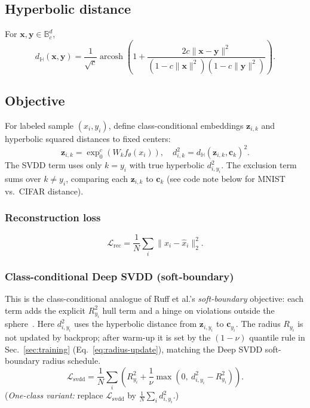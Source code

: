\documentclass[conference]{IEEEtran}
\DeclareMathOperator{\arcosh}{arcosh}
\begin{document}
\subsection{Hyperbolic distance}
For $\mathbf{x},\mathbf{y}\in\mathbb{B}_c^d$,
\begin{equation}
d_{\mathbb{H}}(\mathbf{x},\mathbf{y})=
\frac{1}{\sqrt{c}}
\arcosh\!\left(
1+\frac{2c\|\mathbf{x}-\mathbf{y}\|^2}
{(1-c\|\mathbf{x}\|^2)(1-c\|\mathbf{y}\|^2)}
\right).
\end{equation}

\subsection{Objective}
For labeled sample $(x_i,y_i)$, define class-conditional embeddings $\mathbf{z}_{i,k}$ and hyperbolic squared distances to fixed centers:
\begin{equation}
\mathbf{z}_{i,k} = \exp_0^c(W_k f_{\theta}(x_i)),
\quad
d_{i,k}^2 = d_{\mathbb{H}}(\mathbf{z}_{i,k}, \mathbf{c}_k)^2.
\end{equation}
The SVDD term uses only $k=y_i$ with true hyperbolic $d_{i,y_i}^2$.
The exclusion term sums over $k\neq y_i$, comparing each $\mathbf{z}_{i,k}$ to $\mathbf{c}_k$ (see code note below for MNIST vs.\ CIFAR distance).

\subsubsection{Reconstruction loss}
\begin{equation}
\mathcal{L}_{\text{rec}}=
\frac{1}{N}\sum_i \|x_i-\hat{x}_i\|_2^2.
\end{equation}

\subsubsection{Class-conditional Deep SVDD (soft-boundary)}
This is the class-conditional analogue of Ruff et al.'s \emph{soft-boundary} objective: each term adds the explicit $R_{y_i}^2$ hull term and a hinge on violations outside the sphere~\cite{ruff2018deep}. Here $d_{i,y_i}^2$ uses the hyperbolic distance from $\mathbf{z}_{i,y_i}$ to $\mathbf{c}_{y_i}$. The radius $R_{y_i}$ is not updated by backprop; after warm-up it is set by the $(1{-}\nu)$ quantile rule in Sec.~\ref{sec:training} (Eq.~\eqref{eq:radius-update}), matching the Deep SVDD soft-boundary radius schedule.
\begin{equation}
\mathcal{L}_{\text{svdd}}=
\frac{1}{N}\sum_i
\left(
R_{y_i}^2 + \frac{1}{\nu}\max\left(0,\ d_{i,y_i}^2 - R_{y_i}^2\right)
\right).
\end{equation}
(\emph{One-class variant:} replace $\mathcal{L}_{\text{svdd}}$ by $\frac1N\sum_i d_{i,y_i}^2$.)
\end{document}
